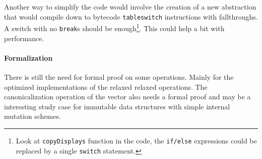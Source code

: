 Another way to simplify the code would involve the creation of a new abstraction that would compile down to bytecode \texttt{tableswitch} instructions with fallthroughs. A switch with no \texttt{break}s should be enough\footnote{Look at \texttt{copyDisplays} function in the code, the \texttt{if/else} expressions could be replaced by a single \texttt{switch} statement.}. This could help a bit with performance.

\paragraph{Formalization}
There is still the need for formal proof on some operations. Mainly for the optimized implementations of the relaxed relaxed operations. The canonicalization operation of the vector also needs a formal proof and may be a interesting study case for immutable data structures with simple internal mutation schemes.


